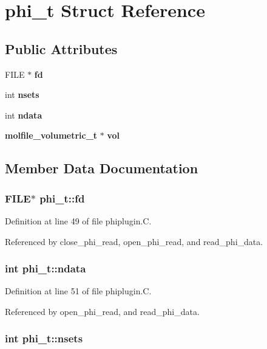 \section{phi\_\-t  Struct Reference}
\label{structphi__t}
\subsection*{Public Attributes}
\begin{CompactItemize}
\item 
FILE $\ast$ {\bf fd}
\item 
int {\bf nsets}
\item 
int {\bf ndata}
\item 
{\bf molfile\_\-volumetric\_\-t} $\ast$ {\bf vol}
\end{CompactItemize}


\subsection{Member Data Documentation}
\subsubsection{\setlength{\rightskip}{0pt plus 5cm}FILE$\ast$ phi\_\-t::fd}\label{structphi__t_m0}




Definition at line 49 of file phiplugin.C.

Referenced by close\_\-phi\_\-read, open\_\-phi\_\-read, and read\_\-phi\_\-data.
\subsubsection{\setlength{\rightskip}{0pt plus 5cm}int phi\_\-t::ndata}\label{structphi__t_m2}




Definition at line 51 of file phiplugin.C.

Referenced by open\_\-phi\_\-read, and read\_\-phi\_\-data.
\subsubsection{\setlength{\rightskip}{0pt plus 5cm}int phi\_\-t::nsets}\label{structphi__t_m1}




